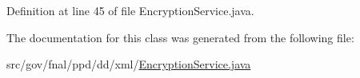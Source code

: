 Definition at line 45 of file Encryption\-Service.\-java.



The documentation for this class was generated from the following file\-:\begin{DoxyCompactItemize}
\item 
src/gov/fnal/ppd/dd/xml/\hyperlink{EncryptionService_8java}{Encryption\-Service.\-java}\end{DoxyCompactItemize}
